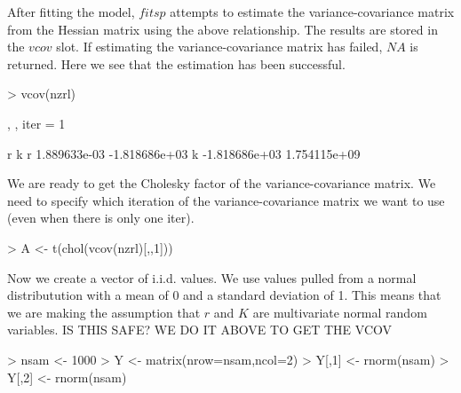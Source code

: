 \documentclass[a4paper]{article}
\begin{document}
After fitting the model, $fitsp$ attempts to estimate the variance-covariance matrix from the Hessian matrix using the above relationship. The results are stored in the $vcov$ slot. If estimating the variance-covariance matrix has failed, $NA$ is returned. Here we see that the estimation has been successful.
\begin{center}
\begin{minipage}[H]{0.95\textwidth}%
\begin{shaded}%
\begin{Schunk}
\begin{Sinput}
> vcov(nzrl)
\end{Sinput}
\begin{Soutput}
, , iter = 1

   
                r             k
  r  1.889633e-03 -1.818686e+03
  k -1.818686e+03  1.754115e+09
\end{Soutput}
\end{Schunk}
\end{shaded}%
\end{minipage}
\end{center}

We are ready to get the Cholesky factor of the variance-covariance matrix. We need to specify which iteration of the variance-covariance matrix we want to use (even when there is only one iter).
\begin{center}
\begin{minipage}[H]{0.95\textwidth}%
\begin{shaded}%
\begin{Schunk}
\begin{Sinput}
> A <- t(chol(vcov(nzrl)[,,1]))
\end{Sinput}
\end{Schunk}
\end{shaded}%
\end{minipage}
\end{center}

Now we create a vector of i.i.d. values. We use values pulled from a normal distributution with a mean of 0 and a standard deviation of 1. This means that we are making the assumption that $r$ and $K$ are multivariate normal random variables.
IS THIS SAFE? WE DO IT ABOVE TO GET THE VCOV  

\begin{center}
\begin{minipage}[H]{0.95\textwidth}%
\begin{shaded}%
\begin{Schunk}
\begin{Sinput}
> nsam <- 1000
> Y <- matrix(nrow=nsam,ncol=2)
> Y[,1] <- rnorm(nsam)
> Y[,2] <- rnorm(nsam)
\end{Sinput}
\end{Schunk}
\end{shaded}%
\end{minipage}
\end{center}
\end{document}
